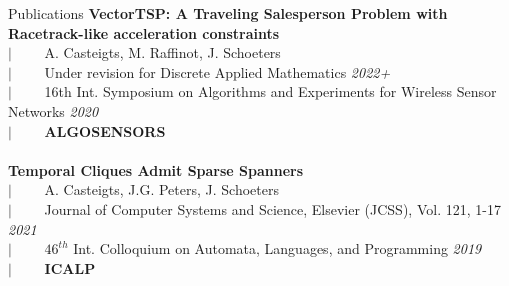 \documentclass[french]{resume} %
\begin{document}
\begin{rSection}{Publications }
{\bf VectorTSP: A Traveling Salesperson Problem with Racetrack-like acceleration constraints}\\
$| \qquad$ A. Casteigts, M. Raffinot, J. Schoeters\\
$| \qquad$ Under revision for Discrete Applied Mathematics \hfill {\em 2022+}\\
$| \qquad$ 16th Int. Symposium on Algorithms and Experiments for Wireless Sensor Networks \hfill {\em 2020}\\
$| \qquad$ \textbf{ALGOSENSORS} 
\\ \\
{\bf Temporal Cliques Admit Sparse Spanners}\\
$| \qquad$ A. Casteigts, J.G. Peters, J. Schoeters\\
$| \qquad$ Journal of Computer Systems and Science, Elsevier (JCSS), Vol. 121, 1-17 \hfill {\em 2021}\\
$| \qquad$ $46^{th}$ Int. Colloquium on Automata, Languages, and Programming \hfill {\em 2019}\\
$| \qquad$ \textbf{ICALP}
\end{rSection}

\end{document}
